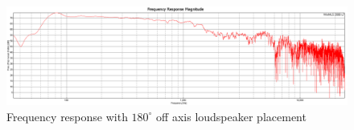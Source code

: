 \documentclass{article}
\begin{document}
\begin{figure}[htbp]
\begin{center}
\includegraphics[width=15cm,keepaspectratio=true]{Figures/TaskBFR180deg}
\caption{Frequency response with $180^\circ$ off axis loudspeaker placement}
\label{fig:TaskBFR180deg}
\end{center}
\end{figure}
\end{document}
